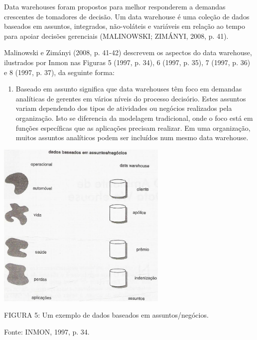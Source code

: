 \documentclass[a4paper]{article}
\newcommand\liststyleWWviiiNumxii{%
\renewcommand\theenumi{\alph{enumi}}
\renewcommand\theenumii{\arabic{enumii}}
\renewcommand\theenumiii{\arabic{enumiii}}
\renewcommand\theenumiv{\arabic{enumiv}}
\renewcommand\labelenumi{\theenumi)}
\renewcommand\labelenumii{\theenumii.}
\renewcommand\labelenumiii{\theenumiii.}
\renewcommand\labelenumiv{\theenumiv.}
}
\begin{document}
{\sffamily
Data warehouses foram propostos para melhor responderem a demandas crescentes de tomadores de decis\~ao. Um data
warehouse \'e uma cole\c{c}\~ao de dados baseados em assuntos, integrados, n\~ao-vol\'ateis e vari\'aveis em
rela\c{c}\~ao ao tempo para apoiar decis\~oes gerenciais (MALINOWSKI; ZIM\'ANYI, 2008, p. 41).}

{
\textsf{Malinowski e Zim\'anyi (2008, p. 41-42) descrevem os aspectos do data warehouse, ilustrados por Inmon nas
Figuras 5 (1997, p. 34), 6 (1997, p. 35), 7 (1997, p. 36) e 8 (1997, p. 37), da seguinte forma:}}

\liststyleWWviiiNumxii
\begin{enumerate}
\item {
\textsf{Baseado em assunto significa que data warehouses t\^em foco em demandas anal\'iticas de gerentes em v\'arios
n\'iveis do processo decis\'orio. Estes assuntos variam dependendo dos tipos de atividades ou neg\'ocios realizados
pela organiza\c{c}\~ao. Isto se diferencia da modelagem tradicional, onde o foco est\'a em fun\c{c}\~oes espec\'ificas
que as aplica\c{c}\~oes precisam realizar. Em uma organiza\c{c}\~ao, muitos assuntos anal\'iticos podem ser inclu\'idos
num mesmo data warehouse. }}
\end{enumerate}
 \includegraphics[width=8.174cm,height=8.073cm]{monograph-img005.jpg} 

{
\textsf{\MakeUppercase{FIGURA }}\textsf{5: Um exemplo de dados baseados em assuntos/neg\'ocios. }}

{
\textsf{Fonte: INMON, 1997, p. 34. \ }}
\end{document}
